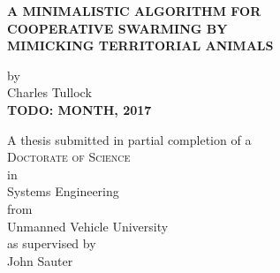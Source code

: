 \begin{titlepage}
	\begin{center}

		\vspace*{1cm}
		 
		\large{ \textbf{ \uppercase{A minimalistic algorithm for\\cooperative swarming by\\mimicking territorial animals}}}
		
		
		\vspace{1.5cm}
		
		by\\
		Charles Tullock\\
		\textbf{TODO: MONTH, 2017}
		
		\vspace{3cm}
		
		A thesis submitted in partial completion of a\\
		\large{\textsc{Doctorate of Science}}\\ 
		in\\
		\large{Systems Engineering}\\
		from\\
		\large{Unmanned Vehicle University}\\
		as supervised by\\
		\large{John Sauter}
		\vfill

	\end{center}
\thispagestyle{empty}
\end{titlepage}

